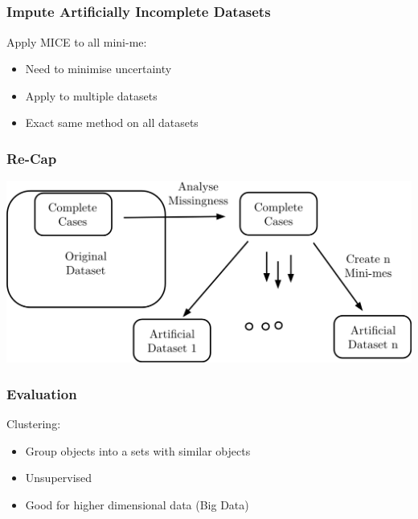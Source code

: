 \documentclass{beamer}
\begin{document}
\subsection{}

\begin{frame}
  \frametitle{Impute Artificially Incomplete Datasets}
  Apply MICE to all mini-me:
  \begin{itemize}
    \item Need to minimise uncertainty 
    \item Apply to multiple datasets
    \item Exact same method on all datasets
  \end{itemize}
\end{frame}

\begin{frame}
  \frametitle{Re-Cap}
  \centerline{\includegraphics[width=\paperwidth]{datasets}}
\end{frame}

\begin{frame}
  \frametitle{Evaluation}
  Clustering:
  \begin{itemize}
    \item Group objects into a sets with similar objects
    \item Unsupervised 
    \item Good for higher dimensional data (Big Data) 
  \end{itemize}
\end{frame}
\end{document}
